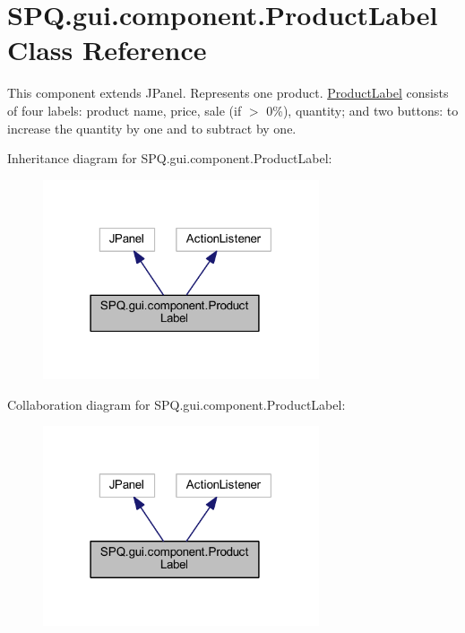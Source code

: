 \hypertarget{class_s_p_q_1_1gui_1_1component_1_1_product_label}{}\section{S\+P\+Q.\+gui.\+component.\+Product\+Label Class Reference}
\label{class_s_p_q_1_1gui_1_1component_1_1_product_label}


This component extends J\+Panel. Represents one product. \mbox{\hyperlink{class_s_p_q_1_1gui_1_1component_1_1_product_label}{Product\+Label}} consists of four labels\+: product name, price, sale (if $>$ 0\%), quantity; and two buttons\+: to increase the quantity by one and to subtract by one.  




Inheritance diagram for S\+P\+Q.\+gui.\+component.\+Product\+Label\+:\nopagebreak
\begin{figure}[H]
\begin{center}
\leavevmode
\includegraphics[width=231pt]{class_s_p_q_1_1gui_1_1component_1_1_product_label__inherit__graph}
\end{center}
\end{figure}


Collaboration diagram for S\+P\+Q.\+gui.\+component.\+Product\+Label\+:\nopagebreak
\begin{figure}[H]
\begin{center}
\leavevmode
\includegraphics[width=231pt]{class_s_p_q_1_1gui_1_1component_1_1_product_label__coll__graph}
\end{center}
\end{figure}

